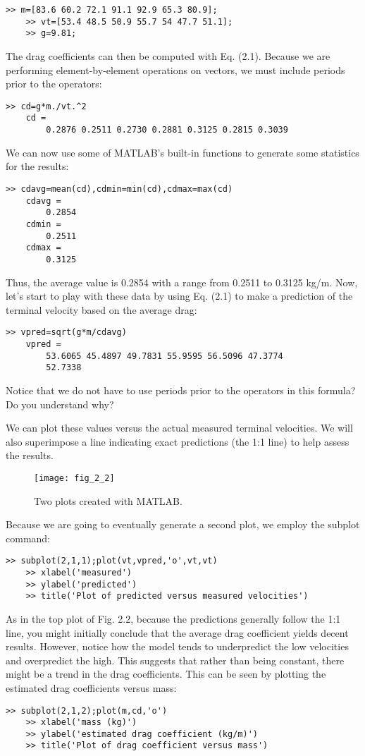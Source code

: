 \documentclass[../main.tex]{subfiles}
\begin{document}
\begin{lstlisting}[frame=none, numbers=none]
	>> m=[83.6 60.2 72.1 91.1 92.9 65.3 80.9];
	>> vt=[53.4 48.5 50.9 55.7 54 47.7 51.1];
	>> g=9.81;
\end{lstlisting}

The drag coefficients can then be computed with Eq. (2.1). Because we are performing
element-by-element operations on vectors, we must include periods prior to the operators:
\begin{lstlisting}[frame=none, numbers=none]
	>> cd=g*m./vt.^2
	cd =
		0.2876 0.2511 0.2730 0.2881 0.3125 0.2815 0.3039
\end{lstlisting}
We can now use some of MATLAB's built-in functions to generate some statistics for the
results:
\begin{lstlisting}[frame=none, numbers=none]
	>> cdavg=mean(cd),cdmin=min(cd),cdmax=max(cd)
	cdavg =
		0.2854
	cdmin =
		0.2511
	cdmax =
		0.3125
\end{lstlisting}
Thus, the average value is 0.2854 with a range from 0.2511 to 0.3125 kg/m.
Now, let's start to play with these data by using Eq. (2.1) to make a prediction of the
terminal velocity based on the average drag:
\begin{lstlisting}[frame=none, numbers=none]
	>> vpred=sqrt(g*m/cdavg)
	vpred =
		53.6065 45.4897 49.7831 55.9595 56.5096 47.3774
		52.7338
\end{lstlisting}
Notice that we do not have to use periods prior to the operators in this formula? Do you
understand why?


We can plot these values versus the actual measured terminal velocities. We will also
superimpose a line indicating exact predictions (the 1:1 line) to help assess the results.


\begin{figure}[H]
	\centering
	\texttt{[image: fig\_2\_2]}
   \caption{\textsf{Two plots created with MATLAB.}}
   \label{fig_2_2}
\end{figure}


Because we are going to eventually generate a second plot, we employ the subplot
command:
\begin{lstlisting}[frame=none, numbers=none]
	>> subplot(2,1,1);plot(vt,vpred,'o',vt,vt)
	>> xlabel('measured')
	>> ylabel('predicted')
	>> title('Plot of predicted versus measured velocities')
\end{lstlisting}


As in the top plot of Fig. 2.2, because the predictions generally follow the 1:1 line, you
might initially conclude that the average drag coefficient yields decent results. However,
notice how the model tends to underpredict the low velocities and overpredict the high.
This suggests that rather than being constant, there might be a trend in the drag coefficients.
This can be seen by plotting the estimated drag coefficients versus mass:
\begin{lstlisting}[frame=none, numbers=none]
	>> subplot(2,1,2);plot(m,cd,'o')
	>> xlabel('mass (kg)')
	>> ylabel('estimated drag coefficient (kg/m)')
	>> title('Plot of drag coefficient versus mass')
\end{lstlisting}
\end{document}
